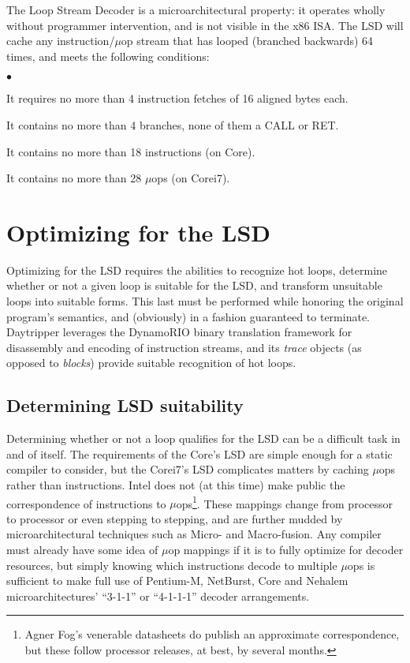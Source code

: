 \documentclass[]{sigplanconf}
\newcommand{\squishlist}{\begin{list}{$\bullet$}
  {\setlength{\itemsep}{0pt}
    \setlength{\parsep}{3pt}
    \setlength{\topsep}{3pt}
    \setlength{\partopsep}{0pt}
    \setlength{\leftmargin}{1.5em}
    \setlength{\labelwidth}{1em}
    \setlength{\labelsep}{0.5em}}}
\newcommand{\squishend}{\end{list}}
\begin{document}
The Loop Stream Decoder is a microarchitectural property: it operates wholly
without programmer intervention, and is not visible in the x86 ISA. The LSD
will cache any instruction/$\mu$op stream that has looped (branched backwards)
64 times, and meets the following conditions:
\squishlist
\item It requires no more than 4 instruction fetches of 16 aligned
bytes each.
\item It contains no more than 4 branches, none of them a CALL or RET.
\item It contains no more than 18 instructions (on Core).
\item It contains no more than 28 $\mu$ops (on Core\texttrademark i7).
\squishend

\section{Optimizing for the LSD}
Optimizing for the LSD requires the abilities to recognize hot loops, determine
whether or not a given loop is suitable for the LSD, and transform unsuitable
loops into suitable forms. This last must be performed while honoring the
original program's semantics, and (obviously) in a fashion guaranteed to
terminate. Daytripper leverages the DynamoRIO binary translation framework
for disassembly and encoding of instruction streams, and its \textit{trace}
objects (as opposed to \textit{blocks}) provide suitable recognition of hot
loops.

\subsection{Determining LSD suitability}
Determining whether or not a loop qualifies for the LSD can be a difficult task
in and of itself. The requirements of the Core's LSD are simple
enough for a static compiler to consider, but the Core\texttrademark i7's LSD
complicates matters by caching $\mu$ops rather than instructions. Intel does
not (at this time) make public the correspondence of instructions to $\mu$ops\footnote{Agner Fog's venerable datasheets \cite{agnerfog} do publish an approximate correspondence, but these follow processor releases, at best, by several months.}. These 
mappings change from processor to processor or even stepping to stepping, and
are further mudded by microarchitectural techniques such as Micro- and Macro-fusion. Any
compiler must already have some idea of $\mu$op mappings
if it is to fully optimize for decoder resources, but simply knowing which
instructions decode to multiple $\mu$ops is sufficient to make full use of
Pentium-M, NetBurst, Core and Nehalem microarchitectures' ``3-1-1'' or ``4-1-1-1''
decoder arrangements.
\end{document}
